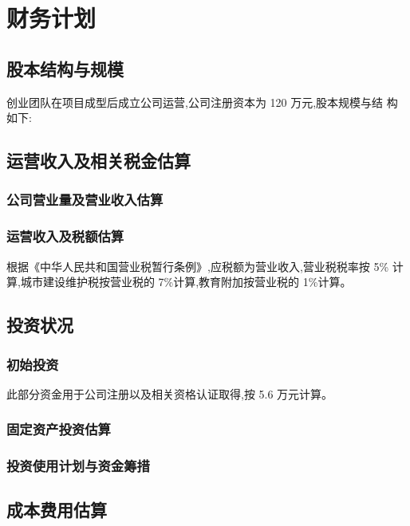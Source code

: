 \chapter{财务计划}
\section{股本结构与规模}
创业团队在项目成型后成立公司运营,公司注册资本为 120 万元,股本规模与结
构如下:

\section{运营收入及相关税金估算}

\subsection{公司营业量及营业收入估算}

\subsection{运营收入及税额估算}
根据《中华人民共和国营业税暂行条例》,应税额为营业收入,营业税税率按 5\%
计算,城市建设维护税按营业税的 7\%计算,教育附加按营业税的 1\%计算。

\section{投资状况}

\subsection{初始投资}

此部分资金用于公司注册以及相关资格认证取得,按 5.6 万元计算。

\subsection{固定资产投资估算}

\subsection{投资使用计划与资金筹措}

\section{成本费用估算}
